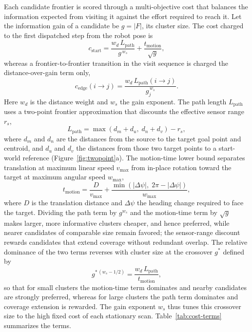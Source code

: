 Each candidate frontier is scored through a multi-objective cost that balances
the information expected from visiting it against the effort required to reach
it. Let the information gain of a candidate be $g=\lvert F\rvert$, its cluster
size. The cost charged to the first dispatched step from the robot pose is
\begin{equation}
  c_{\mathrm{start}} = \frac{w_d\,L_{\mathrm{path}}}{g^{\,w_s}}
    + \frac{t_{\mathrm{motion}}}{\sqrt{g}},
  \label{eq:cstart}
\end{equation}
whereas a frontier-to-frontier transition in the visit sequence is charged the
distance-over-gain term only,
\begin{equation}
  c_{\mathrm{edge}}(i\!\to\! j) =
    \frac{w_d\,L_{\mathrm{path}}(i\!\to\! j)}{g_j^{\,w_s}}.
  \label{eq:cedge}
\end{equation}
Here $w_d$ is the distance weight and $w_s$ the gain exponent. The path length
$L_{\mathrm{path}}$ uses a two-point frontier approximation that discounts the
effective sensor range $r_s$,
\begin{equation}
  L_{\mathrm{path}} = \max(d_m+d_u,\; d_n+d_v) - r_s,
  \label{eq:lpath}
\end{equation}
where $d_m$ and $d_n$ are the distances from the source to the target goal
point and centroid, and $d_u$ and $d_v$ the distances from those two target
points to a start-world reference (Figure~\ref{fig:twopoint}a). The motion-time
lower bound separates translation at maximum linear speed $v_{\max}$ from
in-place rotation toward the target at maximum angular speed $w_{\max}$,
\begin{equation}
  t_{\mathrm{motion}} = \frac{D}{v_{\max}}
    + \frac{\min(\lvert\Delta\psi\rvert,\;2\pi-\lvert\Delta\psi\rvert)}{w_{\max}},
  \label{eq:tmotion}
\end{equation}
where $D$ is the translation distance and $\Delta\psi$ the heading change
required to face the target. Dividing the path term by $g^{w_s}$ and the
motion-time term by $\sqrt{g}$ makes larger, more informative clusters
cheaper, and hence preferred, while nearer candidates of comparable size
remain favored; the
sensor-range discount rewards candidates that extend coverage without redundant
overlap. The relative dominance of the two terms reverses with cluster size at
the crossover $g^*$ defined by
\begin{equation}
  g^{*\,(w_s-1/2)} = \frac{w_d\,L_{\mathrm{path}}}{t_{\mathrm{motion}}},
  \label{eq:crossover}
\end{equation}
so that for small clusters the motion-time term dominates and nearby candidates
are strongly preferred, whereas for large clusters the path term dominates and
coverage extension is rewarded. The gain exponent $w_s$ thus tunes this
crossover size to the high fixed cost of each stationary scan.
Table~\ref{tab:cost-terms} summarizes the terms.

